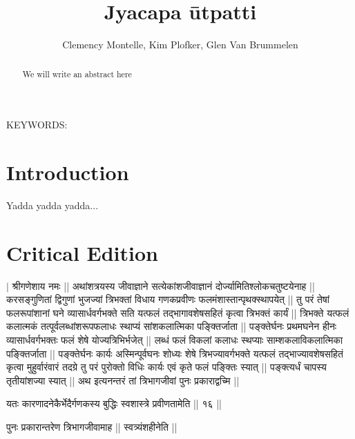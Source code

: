 \documentclass[12pt]{article}
\begin{document}
\title{Jyacapa ūtpatti}
\author{Clemency Montelle, Kim Plofker, Glen Van Brummelen}

\maketitle

\begin{abstract}
We will write an abstract here
\end{abstract}


\vskip30pt

KEYWORDS: 

\newpage

\section{Introduction} 

Yadda yadda yadda...

\section{Critical Edition}






\beginnumbering

\pstart
{\s $|$  श्रीगणेशाय नमः ||
अथांशत्रयस्य जीवाज्ञाने सत्येकांशजीवाज्ञानं
दोर्ज्यामितिश्लोकचतुष्टयेनाह ||
करसङ्गुणितां द्विगुणां भुजज्यां
त्रिभक्तां विधाय
गणकप्रवीणः फलमंशास्तान्पृथक्स्थापयेत् ||
तु परं तेषां फलरूपांशानां घने व्यासार्धवर्गभक्ते सति
यत्फलं तद्भागावशेषसहितं कृत्वा त्रिभक्तं कार्यं ||
त्रिभक्ते यत्फलं कलात्मकं तत्पूर्वलब्धांशरूपफलाधः स्थाप्यं सांशकलात्मिका पङ्क्तिर्जाता ||
पङ्क्तेर्घनः प्रथमघनेन हीनः व्यासार्धवर्गभक्तः फलं शेषे योज्यत्रिभिर्भजेत् ||
लब्धं फलं विकलां कलाधः स्थप्याः साम्शकलाविकलात्मिका
पङ्क्तिर्जाता ||
पङ्क्तेर्घनः कार्यः
अस्मिन्पूर्वघनः शोध्यः शेषे त्रिभज्यावर्गभक्ते यत्फलं तद्भाज्यावशेषसहितं
कृत्वा मुहुर्वारंवारं तदग्रे तु परं पुरोक्तो विधिः कार्यः एवं कृते फलं पङ्क्तिः स्यात् ||
पङ्क्त्यर्धं चापस्य तृतीयांशज्या स्यात् || अथ इत्यनन्तरं तां त्रिभागजीवां पुनः प्रकाराद्वच्मि ||}
\pend

\vskip15pt

\pstart
{\s यतः कारणादनेकैर्भेदैर्गणकस्य बुद्धिः स्वशास्त्रे प्रवीणतामेति || १६ ||}
\pend

\vskip15pt

\pstart
{\s पुनः प्रकारान्तरेण त्रिभागजीवामाह || स्वत्र्यंशहीनेति ||}
\pend
\end{document}
